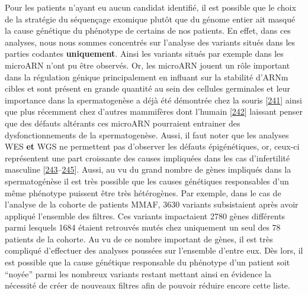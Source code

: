 \documentclass[12pt,a4paper,twoside]{ugathesis}
\theoremstyle{definition}
\theoremstyle{definition}
\theoremstyle{definition}
\theoremstyle{remark}
\begin{document}
Pour les patients n'ayant eu aucun candidat identifié, il est possible
que le choix de la stratégie du séquençage exomique plutôt que du génome
entier ait masqué la cause génétique du phénotype de certains de nos
patients. En effet, dans ces analyses, nous nous sommes concentrés sur
l'analyse des variants situés dans les parties codantes
\textbf{uniquement}. Ainsi les variants situés par exemple dans les
microARN n'ont pu être observés. Or, les microARN jouent un rôle
important dans la régulation génique principalement en influant sur la
stabilité d'ARNm cibles et sont présent en grande quantité au sein des
cellules germinales et leur importance dans la spermatogenèse a déjà été
démontrée chez la souris
{[}\protect\hyperlink{ref-Comazzetto2014}{241}{]} ainsi que plus
récemment chez d'autres mammifères dont l'humain
{[}\protect\hyperlink{ref-Chen2017}{242}{]} laissant penser que des
défauts altérants ces microARN pourraient entrainer des
dysfonctionnements de la spermatogenèse. Aussi, il faut noter que les
analyses WES \textbf{et} WGS ne permettent pas d'observer les défauts
épigénétiques, or, ceux-ci représentent une part croissante des causes
impliquées dans les cas d'infertilité masculine
{[}\protect\hyperlink{ref-Carrell2011}{243}--\protect\hyperlink{ref-Dada2012}{245}{]}.
Aussi, au vu du grand nombre de gènes impliqués dans la spermatogénèse
il est très possible que les causes génétiques responsables d'un même
phénotype puissent être très hétérogènes. Par exemple, dans le cas de
l'analyse de la cohorte de patients MMAF, 3630 variants subsistaient
après avoir appliqué l'ensemble des filtres. Ces variants impactaient
2780 gènes différents parmi lesquels 1684 étaient retrouvés mutés chez
uniquement un seul des 78 patients de la cohorte. Au vu de ce nombre
important de gènes, il est très compliqué d'effectuer des analyses
poussées sur l'ensemble d'entre eux. Dès lors, il est possible que la
cause génétique responsable du phénotype d'un patient soit ``noyée''
parmi les nombreux variants restant mettant ainsi en évidence la
nécessité de créer de nouveaux filtres afin de pouvoir réduire encore
cette liste.
\end{document}
